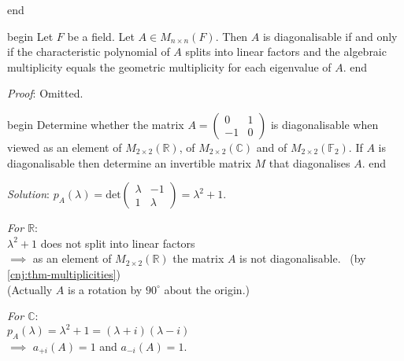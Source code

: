 \documentclass[
  12pt,
  a4paper,
  twoside]{article}
\theoremstyle{plain}
\theoremstyle{definition}
\begin{document}
\csname end

\csname begin\label{cnj:thm-multiplicities}
Let \(F\) be a field. Let \(A \in M_{n \times n}(F)\). Then \(A\) is diagonalisable if and only if the characteristic polynomial of \(A\) splits into linear factors and the algebraic multiplicity equals the geometric multiplicity for each eigenvalue of \(A\).
\csname end

\emph{Proof}: Omitted.

\csname begin\label{cnj:expl-diag-multi}
Determine whether the matrix \(A = \begin{pmatrix} 0 & 1 \\ -1 & 0 \end{pmatrix}\) is diagonalisable when viewed as an element of \(M_{2 \times 2}(\mathbb{R})\), of \(M_{2 \times 2}(\mathbb{C})\) and of \(M_{2 \times 2}(\mathbb{F}_{2})\). If \(A\) is diagonalisable then determine an invertible matrix \(M\) that diagonalises \(A\).
\csname end

\emph{Solution}: \(p_{A}(\lambda) = \mathrm{det} \begin{pmatrix} \lambda & -1 \\ 1 & \lambda \end{pmatrix} = \lambda^{2} + 1\).

\emph{For \(\mathbb{R}\)}:\\
\(\lambda^{2} + 1\) does not split into linear factors\\
\(\implies\) as an element of \(M_{ 2 \times 2}(\mathbb{R})\) the matrix \(A\) is not diagonalisable. \hfill~{(by \ref{cnj:thm-multiplicities})}\\
(Actually \(A\) is a rotation by \(90^{\circ}\) about the origin.)

\emph{For \(\mathbb{C}\)}:\\
\(p_A(\lambda)= \lambda^{2} + 1 = (\lambda + i)(\lambda - i)\)\\
\(\implies\) \(a_{+i}(A) = 1\) and \(a_{-i}(A) = 1\).
\end{document}
